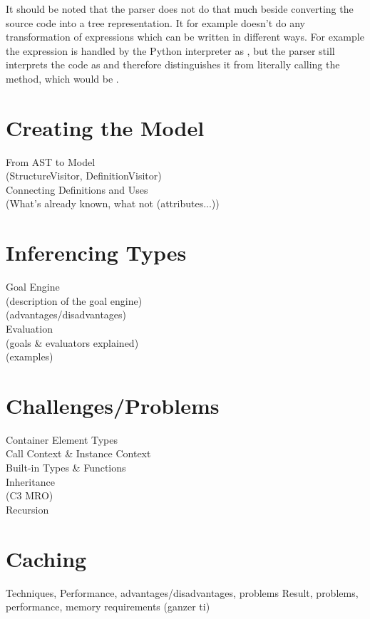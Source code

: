 \documentclass[12pt,halfparskip]{scrreprt}
\begin{document}
It should be noted that the parser does not do that much beside converting the source code into a tree representation. It for example doesn't do any transformation of expressions which can be written in different ways. For example the expression  is handled by the Python interpreter as , but the parser still interprets the code as  and therefore distinguishes it from literally calling the  method, which would be . 

\section{Creating the Model}
From AST to Model \\
(StructureVisitor, DefinitionVisitor)\\
Connecting Definitions and Uses\\
(What's already known, what not (attributes...))\\


\section{Inferencing Types}
Goal Engine \\
 (description of the goal engine)\\
 (advantages/disadvantages)\\
Evaluation\\
 (goals \& evaluators explained)\\
 (examples)\\


\section{Challenges/Problems}
Container Element Types \\
Call Context \& Instance Context \\
Built-in Types \& Functions\\
Inheritance\\
 (C3 MRO)\\
Recursion\\

\section{Caching}
 Techniques, Performance, advantages/disadvantages, problems
 Result, problems, performance, memory requirements (ganzer ti)
\end{document}
